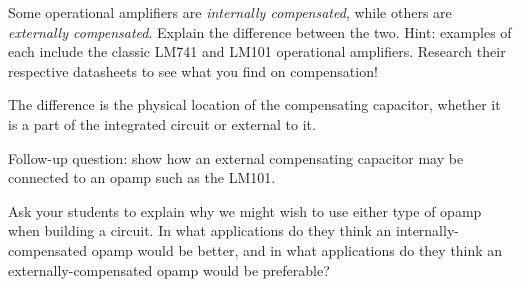 

Some operational amplifiers are {\it internally compensated}, while others are {\it externally compensated}.  Explain the difference between the two.  Hint: examples of each include the classic LM741 and LM101 operational amplifiers.  Research their respective datasheets to see what you find on compensation!







The difference is the physical location of the compensating capacitor, whether it is a part of the integrated circuit or external to it.

\vskip 10pt

Follow-up question: show how an external compensating capacitor may be connected to an opamp such as the LM101.







Ask your students to explain why we might wish to use either type of opamp when building a circuit.  In what applications do they think an internally-compensated opamp would be better, and in what applications do they think an externally-compensated opamp would be preferable?




